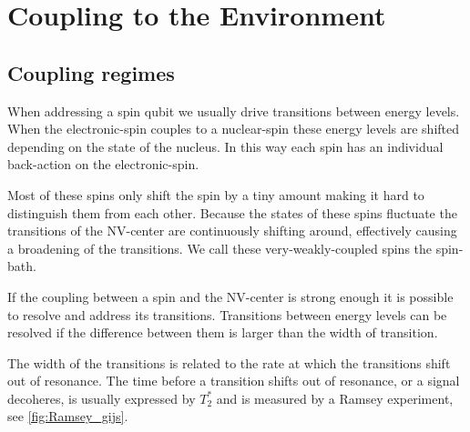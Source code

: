\section{Coupling to the Environment}


\subsection{Coupling regimes}
When addressing a spin qubit we usually drive transitions between energy levels.
When the electronic-spin couples to a nuclear-spin these energy levels are shifted depending on the state of the nucleus.
In this way each spin has an individual back-action on the electronic-spin.

Most of these spins only shift the spin by a tiny amount making it hard to distinguish them from each other.
Because the states of these spins fluctuate the transitions of the NV-center are continuously shifting around, effectively causing a broadening of the transitions.
We call these very-weakly-coupled spins the spin-bath.

If the coupling between a spin and the NV-center is strong enough it is possible to resolve and address its transitions.
Transitions between energy levels can be resolved if the difference between them is larger than the width of transition.


The width of the transitions is related to the rate at which the transitions shift out of resonance.
The time before a transition shifts out of resonance, or a signal decoheres, is usually expressed by $T_2^*$ and is measured by a Ramsey experiment, see \cref{fig:Ramsey_gijs}.

